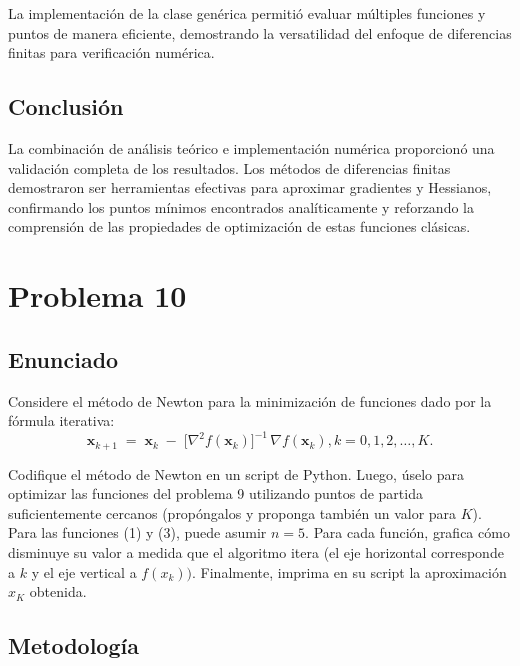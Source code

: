 \documentclass{article}
\begin{document}
La implementación de la clase genérica permitió evaluar múltiples funciones y puntos de manera eficiente, demostrando la versatilidad del enfoque de diferencias finitas para verificación numérica.

\subsection{Conclusión}

La combinación de análisis teórico e implementación numérica proporcionó una validación completa de los resultados. Los métodos de diferencias finitas demostraron ser herramientas efectivas para aproximar gradientes y Hessianos, confirmando los puntos mínimos encontrados analíticamente y reforzando la comprensión de las propiedades de optimización de estas funciones clásicas.

\section{Problema 10}

\subsection{Enunciado}
Considere el método de Newton para la minimización de funciones dado por la fórmula iterativa:
\begin{equation*}
    \mathbf{x}_{k+1} \;=\; \mathbf{x}_{k} \;-\; \bigl[\nabla^{2} f(\mathbf{x}_{k})\bigr]^{-1}\,\nabla f(\mathbf{x}_{k}), k=0,1,2,\dots,K.
\end{equation*}

Codifique el método de Newton en un script de Python. Luego, úselo para optimizar las funciones del problema 9 utilizando puntos de partida suficientemente cercanos (propóngalos y proponga también un valor para $K$). Para las funciones (1) y (3), puede asumir $n = 5$. Para cada función, grafica cómo disminuye su valor a medida que el algoritmo itera (el eje horizontal corresponde a $k$ y el eje vertical a $f(x_k))$. Finalmente, imprima en su script la aproximación $x_K$ obtenida.

\subsection{Metodología}
\end{document}

